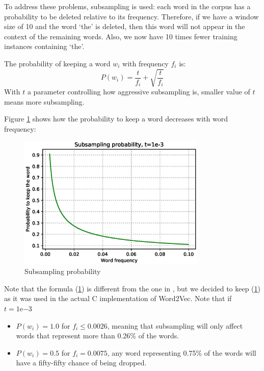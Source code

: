To address these problems, subsampling is used: each word in the corpus has a probability to be deleted relative to its frequency. Therefore, if we have a window size of 10 and the word `the' is deleted, then this word will not appear in the context of the remaining words. Also, we now have 10 times fewer training instances containing `the'.

The probability of keeping a word $w_i$ with frequency $f_i$ is:
\begin{equation}
    P(w_i) = \frac{t}{f_i} + \sqrt{\frac{t}{f_i}}
    \label{subsampling}
\end{equation}
With $t$ a parameter controlling how aggressive subsampling is, smaller value of $t$ means more subsampling. 

\newpage
Figure \ref{subsampling} shows how the probability to keep a word decreases with word frequency:
\begin{figure}[H]
    \centering
    \includegraphics[width=0.8\textwidth]{Images/subsampling_prob.eps}
    \caption{Subsampling probability}
    \label{subsampling}
\end{figure}

Note that the formula (\ref{subsampling}) is different from the one in \cite{word2vec2}, but we decided to keep (\ref{subsampling}) as it was used in the actual C implementation of Word2Vec. Note that if $t=1\mathrm{e}{-3}$
\begin{itemize}
    \item $P(w_i) = 1.0$ for $f_i\leq0.0026$, meaning that subsampling will only affect words that represent more than 0.26\% of the words.
    \item $P(w_i) = 0.5$ for $f_i=0.0075$, any word representing 0.75\% of the words will have a fifty-fifty chance of being dropped.
\end{itemize}

